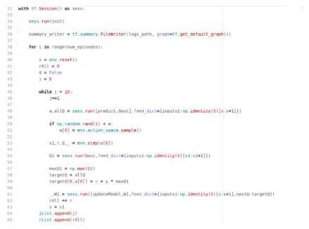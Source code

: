 \begin{figure}[ht]
	\centering
	\includegraphics*[width=15cm,height=20cm,keepaspectratio]{figuras/nchain2} 
	\label{fig:nchain code 2}
\end{figure}

